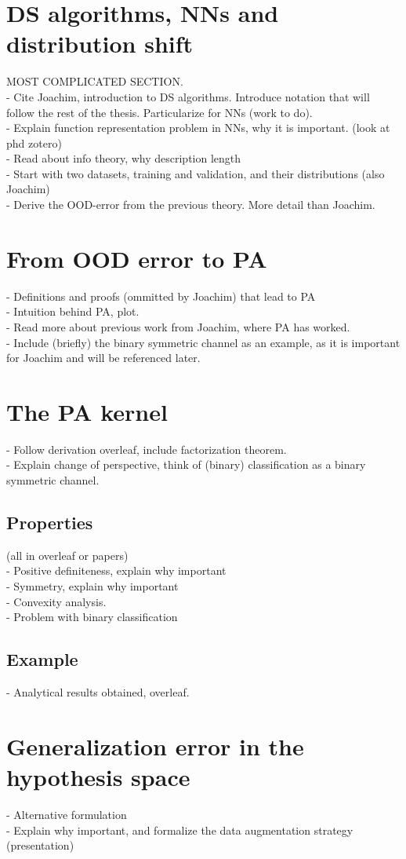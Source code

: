 \section{DS algorithms, NNs and distribution shift}
MOST COMPLICATED SECTION. \\
- Cite Joachim, introduction to DS algorithms. Introduce notation that will follow the
rest of the thesis. Particularize for NNs (work to do).\\
- Explain function representation problem in NNs, why it is important. (look at phd zotero) \\
- Read about info theory, why description length  \\
- Start with two datasets, training and validation, and their distributions (also Joachim) \\
- Derive the OOD-error from the previous theory. More detail than Joachim. \\

\section{From OOD error to PA}
- Definitions and proofs (ommitted by Joachim) that lead to PA \\
- Intuition behind PA, plot. \\
- Read more about previous work from Joachim, where PA has worked. \\
- Include (briefly) the binary symmetric channel as an example, as it is 
important for Joachim and will be referenced later. \\

\section{The PA kernel}
- Follow derivation overleaf, include factorization theorem. \\
- Explain change of perspective, think of (binary) classification as a binary
symmetric channel. \\

\subsection{Properties}
(all in overleaf or papers) \\
- Positive definiteness, explain why important \\
- Symmetry, explain why important \\
- Convexity analysis. \\
- Problem with binary classification \\

\subsection{Example}
- Analytical results obtained, overleaf. \\


\section{Generalization error in the hypothesis space}
- Alternative formulation \\
- Explain why important, and formalize the data augmentation strategy (presentation) \\

